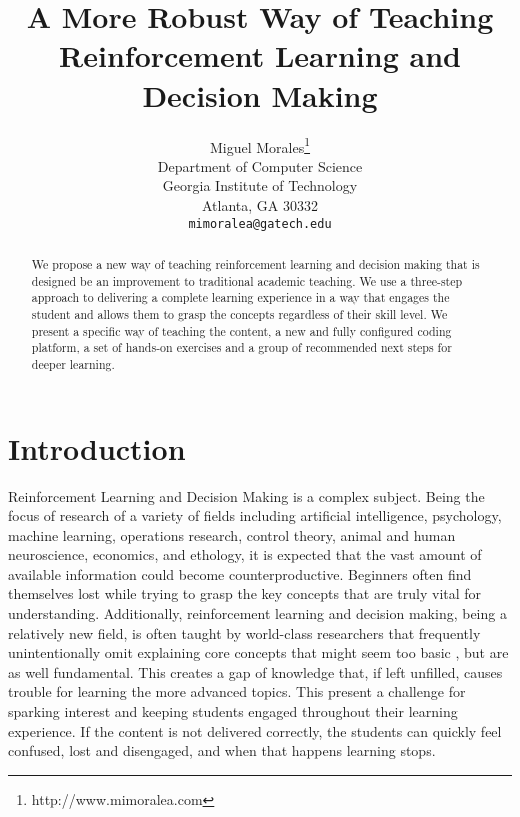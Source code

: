 \documentclass[11pt]{article} %
\title{A More Robust Way of Teaching Reinforcement Learning and Decision Making}
\author{
Miguel Morales\thanks{http://www.mimoralea.com} \\
Department of Computer Science \\
Georgia Institute of Technology \\
Atlanta, GA 30332 \\
\texttt{mimoralea@gatech.edu} \\
}
\begin{document}
\maketitle

\begin{abstract}
   We propose a new way of teaching reinforcement learning and decision making
  that is designed be an improvement to traditional academic teaching. We use
  a three-step approach to delivering a complete learning experience in a
  way that engages the student and allows them to grasp the concepts regardless
  of their skill level. We present a specific way of teaching the content, a
  new and fully configured coding platform, a set of hands-on exercises and
  a group of recommended next steps for deeper learning.
\end{abstract}



\startmain %

\section{Introduction}

Reinforcement Learning and Decision Making is a complex subject. Being the
focus of research of a variety of fields including artificial intelligence,
psychology, machine learning, operations research, control theory, animal
and human neuroscience, economics, and ethology, it is expected that the
vast amount of available information could become counterproductive.
Beginners often find themselves lost while trying to grasp the key concepts
that are truly vital for understanding. Additionally, reinforcement learning
and decision making, being a relatively new field, is often taught by
world-class researchers that frequently unintentionally omit explaining
core concepts that might seem too basic \cite{gapranda}, but are as well
fundamental. This creates a gap of knowledge that, if left unfilled, causes
trouble for learning the more advanced topics. This present a challenge for sparking
interest and keeping students engaged throughout their learning experience. If the
content is not delivered correctly, the students can quickly feel confused, lost and
disengaged, and when that happens learning stops.
\end{document}
